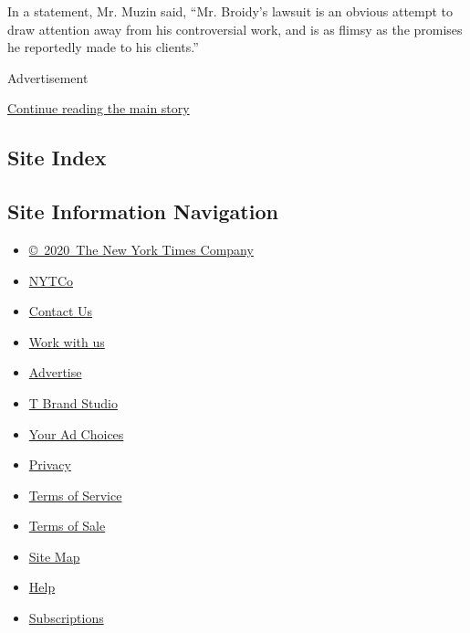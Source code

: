 In a statement, Mr. Muzin said, ``Mr. Broidy's lawsuit is an obvious
attempt to draw attention away from his controversial work, and is as
flimsy as the promises he reportedly made to his clients.''

Advertisement

\protect\hyperlink{after-bottom}{Continue reading the main story}

\hypertarget{site-index}{%
\subsection{Site Index}\label{site-index}}

\hypertarget{site-information-navigation}{%
\subsection{Site Information
Navigation}\label{site-information-navigation}}

\begin{itemize}
\tightlist
\item
  \href{https://help.nytimes.com/hc/en-us/articles/115014792127-Copyright-notice}{©~2020~The
  New York Times Company}
\end{itemize}

\begin{itemize}
\tightlist
\item
  \href{https://www.nytco.com/}{NYTCo}
\item
  \href{https://help.nytimes.com/hc/en-us/articles/115015385887-Contact-Us}{Contact
  Us}
\item
  \href{https://www.nytco.com/careers/}{Work with us}
\item
  \href{https://nytmediakit.com/}{Advertise}
\item
  \href{http://www.tbrandstudio.com/}{T Brand Studio}
\item
  \href{https://www.nytimes.com/privacy/cookie-policy\#how-do-i-manage-trackers}{Your
  Ad Choices}
\item
  \href{https://www.nytimes.com/privacy}{Privacy}
\item
  \href{https://help.nytimes.com/hc/en-us/articles/115014893428-Terms-of-service}{Terms
  of Service}
\item
  \href{https://help.nytimes.com/hc/en-us/articles/115014893968-Terms-of-sale}{Terms
  of Sale}
\item
  \href{https://spiderbites.nytimes.com}{Site Map}
\item
  \href{https://help.nytimes.com/hc/en-us}{Help}
\item
  \href{https://www.nytimes.com/subscription?campaignId=37WXW}{Subscriptions}
\end{itemize}
